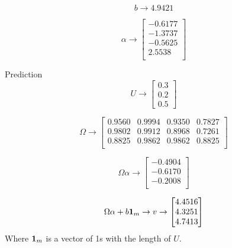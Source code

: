 \begin{equation}
        b\to 4.9421
\end{equation}

\begin{equation}
        \alpha \to \begin{bmatrix}
                -0.6177 \\
                -1.3737 \\
                -0.5625 \\
                2.5538  \\
        \end{bmatrix}
\end{equation}

Prediction
\begin{equation}
        U\to \begin{bmatrix}
                0.3 \\
                0.2 \\
                0.5
        \end{bmatrix}
\end{equation}

\begin{equation}
        \Omega\to \begin{bmatrix}
                0.9560 & 0.9994 & 0.9350 & 0.7827 \\
                0.9802 & 0.9912 & 0.8968 & 0.7261 \\
                0.8825 & 0.9862 & 0.9862 & 0.8825 \\
        \end{bmatrix}
\end{equation}

\begin{equation}
        \Omega\alpha\to \begin{bmatrix}
                -0.4904 \\
                -0.6170 \\
                -0.2008 \\
        \end{bmatrix}
\end{equation}

\begin{equation}
        \Omega\alpha+b\vb{1}_{m}\to v\to \begin{bmatrix}
                4.4516 \\
                4.3251 \\
                4.7413 \\
        \end{bmatrix}
\end{equation}
Where $\vb{1}_{m}$ is a vector of 1s with the length of $U$.


